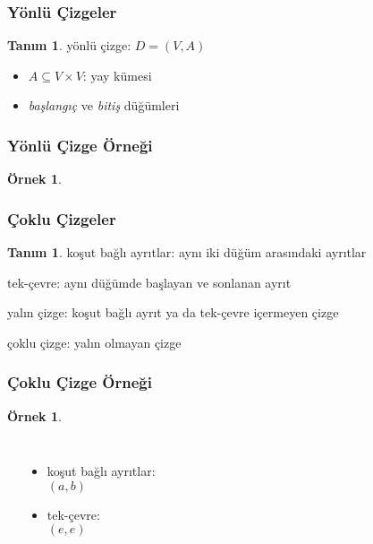 \documentclass[dvipsnames]{beamer}
\theoremstyle{definition}
\newtheorem{tanim}[theorem]{Tanım}
\theoremstyle{example}
\newtheorem{ornek}[theorem]{Örnek}
\theoremstyle{plain}
\begin{document}
\begin{frame}
  \frametitle{Yönlü Çizgeler}

  \begin{tanim}
    \alert{yönlü çizge}:  $D=(V,A)$

    \begin{itemize}
      \item $A \subseteq V \times V$: \alert{yay} kümesi
      \item \emph{başlangıç} ve \emph{bitiş} düğümleri
    \end{itemize}
  \end{tanim}
\end{frame}

\begin{frame}
  \frametitle{Yönlü Çizge Örneği}

  \begin{ornek}
    \begin{center}
    \end{center}
  \end{ornek}
\end{frame}

\begin{frame}
  \frametitle{Çoklu Çizgeler}

  \begin{tanim}
    \alert{koşut bağlı ayrıtlar}: aynı iki düğüm arasındaki ayrıtlar

    \bigskip
    \alert{tek-çevre}: aynı düğümde başlayan ve sonlanan ayrıt

    \pause
    \bigskip
    \alert{yalın çizge}: koşut bağlı ayrıt ya da tek-çevre içermeyen çizge

    \bigskip
    \alert{çoklu çizge}: yalın olmayan çizge
  \end{tanim}
\end{frame}

\begin{frame}
  \frametitle{Çoklu Çizge Örneği}

  \begin{ornek}
    \begin{columns}
      \begin{center}
      \end{center}

      \begin{itemize}
        \item koşut bağlı ayrıtlar:\\
          $(a,b)$
        \item tek-çevre:\\
          $(e,e)$
      \end{itemize}
    \end{columns}
  \end{ornek}
\end{frame}
\end{document}
